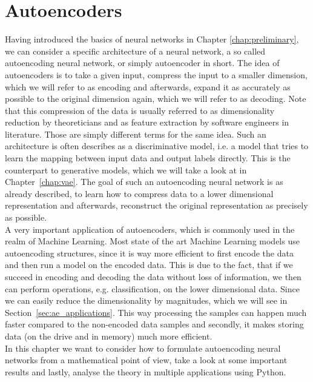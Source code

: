 \chapter{Autoencoders}\label{chap:ae}
Having introduced the basics of neural networks in Chapter \ref{chap:preliminary}, we can consider a specific architecture of a neural network, a so called autoencoding neural network, or simply autoencoder in short. The idea of autoencoders is to take a given input, compress the input to a smaller dimension, which we will refer to as encoding and afterwards, expand it as accurately as possible to the original dimension again, which we will refer to as decoding. Note that this compression of the data is usually referred to as dimensionality reduction by theoreticians and as feature extraction by software engineers in literature. Those are simply different terms for the same idea. Such an architecture is often describes as a discriminative model, i.e. a model that tries to learn the mapping between input data and output labels directly. This is the counterpart to generative models, which we will take a look at in Chapter~\ref{chap:vae}. The goal of such an autoencoding neural network is as already described, to learn how to compress data to a lower dimensional representation and afterwards, reconstruct the original representation as precisely as possible.\\
A very important application of autoencoders, which is commonly used in the realm of Machine Learning. Most state of the art Machine Learning models use autoencoding structures, since it is way more efficient to first encode the data and then run a model on the encoded data.  This is due to the fact, that if we succeed in encoding and decoding the data without loss of information, we then can perform operations, e.g. classification, on the lower dimensional data. Since we can easily reduce the dimensionality by magnitudes, which we will see in Section~\ref{sec:ae_applications}. This way processing the samples can happen much faster compared to the non-encoded data samples and secondly, it makes storing data (on the drive and in memory) much more efficient.\\
In this chapter we want to consider how to formulate autoencoding neural networks from a mathematical point of view, take a look at some important results and lastly, analyse the theory in multiple applications using Python.

